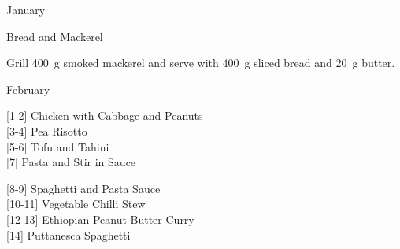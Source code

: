 \begin{menu}{January}
\begin{recipe}{1}{Bread and Mackerel}
\begin{ingredients}
		\end{ingredients}
	
	
    \begin{instructions}
    \item 
        Grill
        400~g  smoked mackerel
        and serve with
        400~g sliced bread
        and
        20~g  butter.
      
    \end{instructions}
    \end{recipe}%
  
    \clearpage
    \end{menu}
	
		\begin{menu}{February}
    
    \begin{recipelist}
    
        {\scriptsize[1-2]} Chicken with Cabbage and Peanuts\\
        {\scriptsize[3-4]} Pea Risotto\\
        {\scriptsize[5-6]} Tofu and Tahini\\
        {\scriptsize[7]} Pasta and Stir in Sauce\\%
    \end{recipelist}%
    \begin{recipelist}
    
        {\scriptsize[8-9]} Spaghetti and Pasta Sauce\\
        {\scriptsize[10-11]} Vegetable Chilli Stew\\
        {\scriptsize[12-13]} Ethiopian Peanut Butter Curry\\
        {\scriptsize[14]} Puttanesca Spaghetti\\%
    \end{recipelist}\par%
  

\end{menu}
